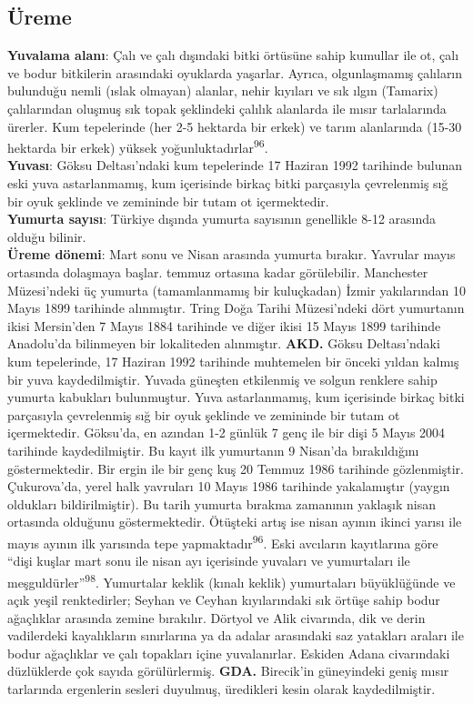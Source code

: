 \documentclass[
  letterpaper,
  DIV=11,
  numbers=noendperiod]{scrreprt}
\begin{document}
\subsection{\texorpdfstring{\textbf{Üreme}}{Üreme}}\label{uxfcreme-5}

\textbf{Yuvalama alanı}: Çalı ve çalı dışındaki bitki örtüsüne sahip
kumullar ile ot, çalı ve bodur bitkilerin arasındaki oyuklarda yaşarlar.
Ayrıca, olgunlaşmamış çalıların bulunduğu nemli (ıslak olmayan) alanlar,
nehir kıyıları ve sık ılgın (Tamarix) çalılarından oluşmuş sık topak
şeklindeki çalılık alanlarda ile mısır tarlalarında ürerler. Kum
tepelerinde (her 2-5 hektarda bir erkek) ve tarım alanlarında (15-30
hektarda bir erkek) yüksek yoğunluktadırlar\textsuperscript{96}.\\
\textbf{Yuvası}: Göksu Deltası'ndaki kum tepelerinde 17 Haziran 1992
tarihinde bulunan eski yuva astarlanmamış, kum içerisinde birkaç bitki
parçasıyla çevrelenmiş sığ bir oyuk şeklinde ve zemininde bir tutam ot
içermektedir.\\
\textbf{Yumurta sayısı}: Türkiye dışında yumurta sayısının genellikle
8-12 arasında olduğu bilinir.\\
\textbf{Üreme dönemi}: Mart sonu ve Nisan arasında yumurta bırakır.
Yavrular mayıs ortasında dolaşmaya başlar. temmuz ortasına kadar
görülebilir. Manchester Müzesi'ndeki üç yumurta (tamamlanmamış bir
kuluçkadan) İzmir yakılarından 10 Mayıs 1899 tarihinde alınmıştır. Tring
Doğa Tarihi Müzesi'ndeki dört yumurtanın ikisi Mersin'den 7 Mayıs 1884
tarihinde ve diğer ikisi 15 Mayıs 1899 tarihinde Anadolu'da bilinmeyen
bir lokaliteden alınmıştır. \textbf{AKD.} Göksu Deltası'ndaki kum
tepelerinde, 17 Haziran 1992 tarihinde muhtemelen bir önceki yıldan
kalmış bir yuva kaydedilmiştir. Yuvada güneşten etkilenmiş ve solgun
renklere sahip yumurta kabukları bulunmuştur. Yuva astarlanmamış, kum
içerisinde birkaç bitki parçasıyla çevrelenmiş sığ bir oyuk şeklinde ve
zemininde bir tutam ot içermektedir. Göksu'da, en azından 1-2 günlük 7
genç ile bir dişi 5 Mayıs 2004 tarihinde kaydedilmiştir. Bu kayıt ilk
yumurtanın 9 Nisan'da bırakıldığını göstermektedir. Bir ergin ile bir
genç kuş 20 Temmuz 1986 tarihinde gözlenmiştir. Çukurova'da, yerel halk
yavruları 10 Mayıs 1986 tarihinde yakalamıştır (yaygın oldukları
bildirilmiştir). Bu tarih yumurta bırakma zamanının yaklaşık nisan
ortasında olduğunu göstermektedir. Ötüşteki artış ise nisan ayının
ikinci yarısı ile mayıs ayının ilk yarısında tepe
yapmaktadır\textsuperscript{96}. Eski avcıların kayıtlarına göre ``dişi
kuşlar mart sonu ile nisan ayı içerisinde yuvaları ve yumurtaları ile
meşguldürler''\textsuperscript{98}. Yumurtalar keklik (kınalı keklik)
yumurtaları büyüklüğünde ve açık yeşil renktedirler; Seyhan ve Ceyhan
kıyılarındaki sık örtüşe sahip bodur ağaçlıklar arasında zemine
bırakılır. Dörtyol ve Alik civarında, dik ve derin vadilerdeki
kayalıkların sınırlarına ya da adalar arasındaki saz yatakları araları
ile bodur ağaçlıklar ve çalı topakları içine yuvalanırlar. Eskiden Adana
civarındaki düzlüklerde çok sayıda görülürlermiş. \textbf{GDA.}
Birecik'in güneyindeki geniş mısır tarlarında ergenlerin sesleri
duyulmuş, üredikleri kesin olarak kaydedilmiştir.
\end{document}
